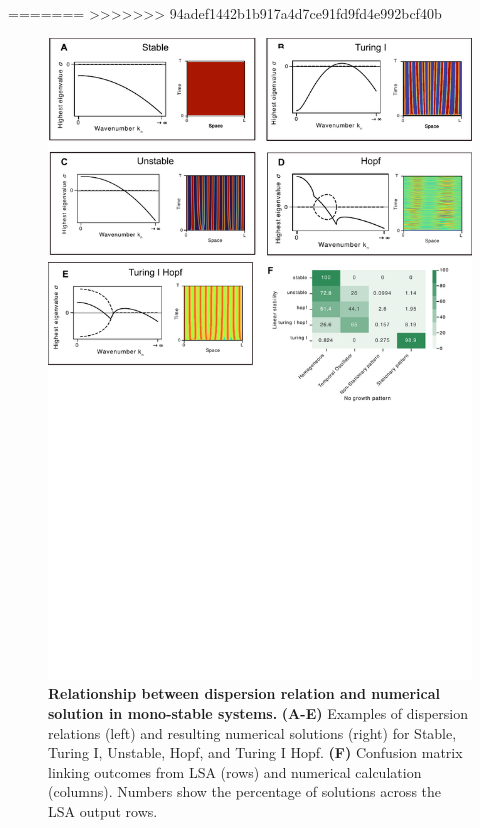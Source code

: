 =======
>>>>>>> 94adef1442b1b917a4d7ce91fd9fd4e992bcf40b
\begin{figure}[H]
    \includegraphics[width=1\textwidth]{figures/dispersion} %
    \caption{\textbf{Relationship between dispersion relation and numerical solution in mono-stable systems.} \textbf{(A-E)} Examples of dispersion relations (left) and resulting numerical solutions (right) for Stable, Turing I, Unstable, Hopf, and Turing I Hopf. \textbf{(F)} Confusion matrix linking outcomes from LSA (rows) and numerical calculation (columns). Numbers show the percentage of solutions across the LSA output rows.}
    \label{fig:dispersions} %
\end{figure}


